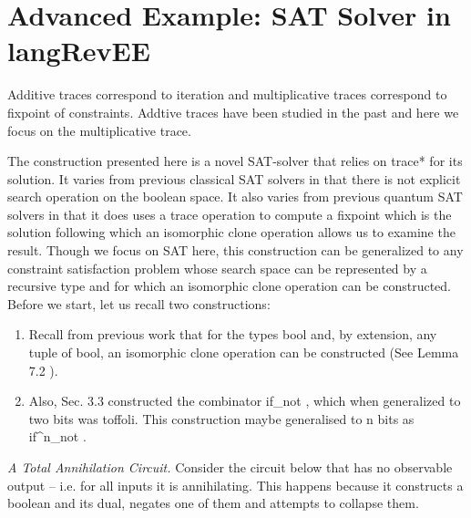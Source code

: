 \documentclass[preprint]{sigplanconf}
\begin{document}
\section{Advanced Example: SAT Solver in {{langRevEE}} }
\label{sec:prog}
\label{sec:sat-solver}

Additive traces correspond to iteration and multiplicative traces
correspond to fixpoint of constraints. Addtive traces have been
studied in the past \cite{infeffects} and here we focus on the
multiplicative trace.

The construction presented here is a novel SAT-solver that relies on
{{trace*}} for its solution. It varies from previous classical SAT
solvers in that there is not explicit search operation on the boolean
space. It also varies from previous quantum SAT solvers in that it
does uses a {{trace}} operation to compute a fixpoint which is the
solution following which an isomorphic clone operation allows us to
examine the result.  Though we focus on SAT here, this construction
can be generalized to any constraint satisfaction problem whose search
space can be represented by a recursive type and for which an
isomorphic clone operation can be constructed. Before we start, let us
recall two constructions:

\begin{enumerate}
\item Recall from previous work that for the types {{bool}} and, by
  extension, any tuple of {{bool}}, an isomorphic clone operation can
  be constructed (See Lemma 7.2 \cite{infeffects}).

\item Also, Sec. 3.3 \cite{infeffects} constructed the combinator
  {{if_{not} }}, which when generalized to two bits was
  {{toffoli}}. This construction maybe generalised to {{n}} bits as
  {{if^n_{not} }}.
\end{enumerate}


\emph{A Total Annihilation Circuit.}  Consider the circuit below that
has no observable output -- i.e. for all inputs it is
annihilating. This happens because it constructs a boolean and its
dual, negates one of them and attempts to collapse them.

\begin{center}
\end{center}
\end{document}
